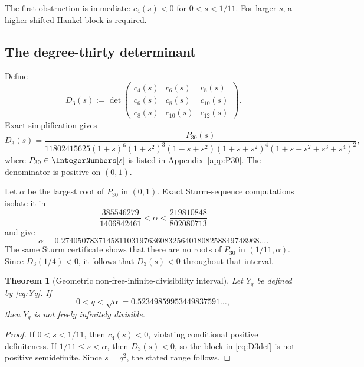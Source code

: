 \documentclass[11pt,oneside]{article}
\newtheorem{theorem}{Theorem}[section]
\theoremstyle{definition}
\theoremstyle{remark}
\begin{document}
The first obstruction is immediate: \(c_4(s)<0\) for \(0<s<1/11\). For larger \(s\), a higher shifted-Hankel block is required.

\subsection{The degree-thirty determinant}
Define
\begin{equation}\label{eq:D3def}
D_3(s):=\det\begin{pmatrix}
c_4(s)&c_6(s)&c_8(s)\\
c_6(s)&c_8(s)&c_{10}(s)\\
c_8(s)&c_{10}(s)&c_{12}(s)
\end{pmatrix}.
\end{equation}
Exact simplification gives
\begin{equation}\label{eq:D3rational}
D_3(s)=\frac{P_{30}(s)}{
11802415625(1+s)^6(1+s^2)^3(1-s+s^2)(1+s+s^2)^4(1+s+s^2+s^3+s^4)^2},
\end{equation}
where \(P_{30}\in\IntegerNumbers[s]\) is listed in Appendix~\ref{app:P30}. The denominator is positive on \((0,1)\).

Let \(\alpha\) be the largest root of \(P_{30}\) in \((0,1)\). Exact
Sturm-sequence computations isolate it in
\begin{equation}\label{eq:alphainterval}
\frac{385546279}{1406842461}<\alpha<\frac{219810848}{802080713}
\end{equation}
and give
\begin{equation}\label{eq:alphaapprox}
\alpha=0.274050783714581103197636083256401808258849748968\ldots.
\end{equation}
The same Sturm certificate shows that there are no roots of \(P_{30}\) in \((1/11,\alpha)\). Since \(D_3(1/4)<0\), it follows that \(D_3(s)<0\) throughout that interval.

\begin{theorem}[Geometric non-free-infinite-divisibility interval]\label{thm:qnotFID}
Let \(Y_q\) be defined by \eqref{eq:Yq}. If
\begin{equation}\label{eq:qthreshold}
0<q<\sqrt\alpha
=0.52349859953449837591\ldots,
\end{equation}
then \(Y_q\) is not freely infinitely divisible.
\end{theorem}
\begin{proof}
If \(0<s<1/11\), then \(c_4(s)<0\), violating conditional positive definiteness. If \(1/11\le s<\alpha\), then \(D_3(s)<0\), so the block in \eqref{eq:D3def} is not positive semidefinite. Since \(s=q^2\), the stated range follows.
\end{proof}
\end{document}
